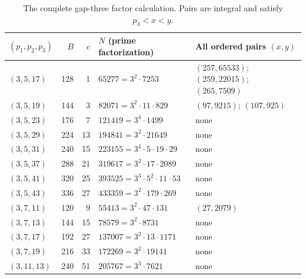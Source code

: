 \begin{table}[htbp]
\centering\small
\caption{The complete gap-three factor calculation. Pairs are integral and satisfy $p_3<x<y$.}
\label{tab:factors}
\begin{tabular}{@{}lrrl p{4.05cm}@{}}
\toprule
$(p_1,p_2,p_3)$ & $B$ & $c$ & $N$ (prime factorization) & All ordered pairs $(x,y)$\\
\midrule
$(3,5,17)$ & 128 & 1 & $65277=3^{2}\cdot7253$ & $(257,65533)$; $(259,22015)$; $(265,7509)$\\
$(3,5,19)$ & 144 & 3 & $82071=3^{2}\cdot11\cdot829$ & $(97,9215)$; $(107,925)$\\
$(3,5,23)$ & 176 & 7 & $121419=3^{4}\cdot1499$ & none\\
$(3,5,29)$ & 224 & 13 & $194841=3^{2}\cdot21649$ & none\\
$(3,5,31)$ & 240 & 15 & $223155=3^{4}\cdot5\cdot19\cdot29$ & none\\
$(3,5,37)$ & 288 & 21 & $319617=3^{2}\cdot17\cdot2089$ & none\\
$(3,5,41)$ & 320 & 25 & $393525=3^{3}\cdot5^{2}\cdot11\cdot53$ & none\\
$(3,5,43)$ & 336 & 27 & $433359=3^{2}\cdot179\cdot269$ & none\\
$(3,7,11)$ & 120 & 9 & $55413=3^{2}\cdot47\cdot131$ & $(27,2079)$\\
$(3,7,13)$ & 144 & 15 & $78579=3^{2}\cdot8731$ & none\\
$(3,7,17)$ & 192 & 27 & $137007=3^{2}\cdot13\cdot1171$ & none\\
$(3,7,19)$ & 216 & 33 & $172269=3^{2}\cdot19141$ & none\\
$(3,11,13)$ & 240 & 51 & $205767=3^{3}\cdot7621$ & none\\
\bottomrule
\end{tabular}
\end{table}
